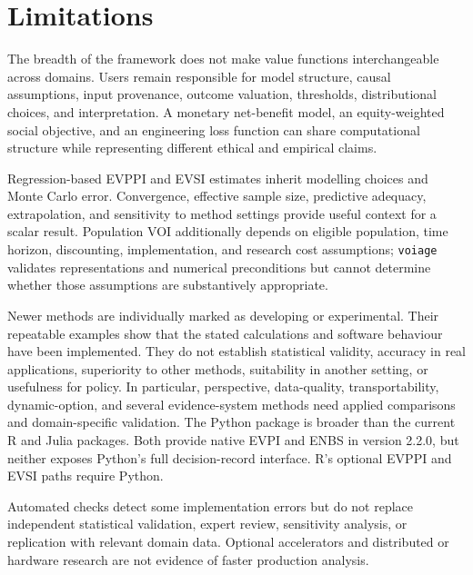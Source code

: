 \section{Limitations}

The breadth of the framework does not make value functions interchangeable
across domains. Users remain responsible for model structure, causal
assumptions, input provenance, outcome valuation, thresholds, distributional
choices, and interpretation. A monetary net-benefit model, an equity-weighted
social objective, and an engineering loss function can share computational
structure while representing different ethical and empirical claims.

Regression-based EVPPI and EVSI estimates inherit modelling choices and Monte
Carlo error. Convergence, effective sample size, predictive adequacy,
extrapolation, and sensitivity to method settings provide useful context for a
scalar result. Population VOI additionally depends on
eligible population, time horizon, discounting, implementation, and research
cost assumptions; \texttt{voiage} validates representations and numerical
preconditions but cannot determine whether those assumptions are substantively
appropriate.

Newer methods are individually marked as developing or experimental. Their
repeatable examples show that the stated calculations and software behaviour
have been implemented. They do not establish statistical validity, accuracy in
real applications, superiority to other methods, suitability in another
setting, or usefulness for policy. In particular,
perspective, data-quality, transportability, dynamic-option, and several
evidence-system methods need applied comparisons and domain-specific validation.
The Python package is broader than the current R and Julia packages. Both
provide native EVPI and ENBS in version 2.2.0, but neither exposes Python's
full decision-record interface. R's optional EVPPI and EVSI paths require Python.

Automated checks detect some implementation errors but do not replace
independent statistical validation, expert review, sensitivity analysis, or
replication with relevant domain data. Optional accelerators and distributed
or hardware research are not evidence of faster production analysis.
